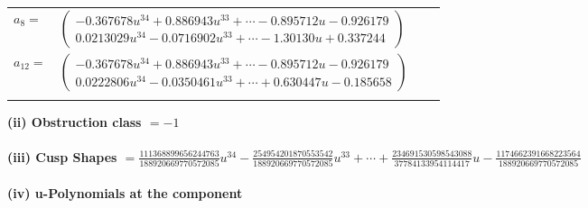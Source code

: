 \documentclass[1p]{elsarticle_modified}
\theoremstyle{definition}
\begin{document}
\begin{tabular}{m{7pt} m{180pt} m{7pt} m{180pt} }
\flushright $a_{8}=$&$\begin{pmatrix}-0.367678 u^{34}+0.886943 u^{33}+\cdots-0.895712 u-0.926179\\0.0213029 u^{34}-0.0716902 u^{33}+\cdots-1.30130 u+0.337244\end{pmatrix}$ \\
\flushright $a_{12}=$&$\begin{pmatrix}-0.367678 u^{34}+0.886943 u^{33}+\cdots-0.895712 u-0.926179\\0.0222806 u^{34}-0.0350461 u^{33}+\cdots+0.630447 u-0.185658\end{pmatrix}$\\&\end{tabular}
\flushleft \textbf{(ii) Obstruction class $= -1$}\\~\\
\flushleft \textbf{(iii) Cusp Shapes $= \frac{111368899656244763}{188920669770572085} u^{34}-\frac{254954201870553542}{188920669770572085} u^{33}+\cdots+\frac{234691530598543088}{37784133954114417} u-\frac{1174662391668223564}{188920669770572085}$}\\~\\
\newpage\renewcommand{\arraystretch}{1}
\flushleft \textbf{(iv) u-Polynomials at the component}\newline \\
\end{document}
